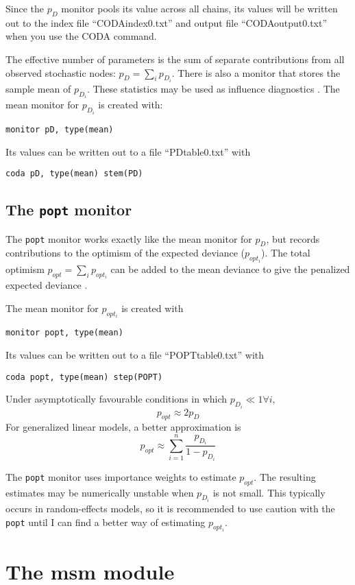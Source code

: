 \documentclass[11pt, a4paper, titlepage]{report}
\begin{document}
Since the $p_D$ monitor pools its value across all chains, its values
will be written out to the index file ``CODAindex0.txt'' and
output file ``CODAoutput0.txt'' when you use the CODA command.

The effective number of parameters is the sum of separate contributions
from all observed stochastic nodes: $p_D = \sum_i p_{D_i}$. There is
also a monitor that stores the sample mean of $p_{D_i}$. These statistics
may be used as influence diagnostics \cite{spiegelhalter:etal:2002}.
The mean monitor for $p_{D_i}$ is created with:
\begin{verbatim}
monitor pD, type(mean)
\end{verbatim}
Its values can be written out to a file ``PDtable0.txt'' with
\begin{verbatim}
coda pD, type(mean) stem(PD)
\end{verbatim}

\subsection{The \texttt{popt} monitor}

The \verb+popt+ monitor works exactly like the mean monitor for $p_D$,
but records contributions to the optimism of the expected deviance
($p_{opt_i}$). The total optimism $p_{opt} = \sum_i p_{opt_i}$  can be
added to the mean deviance to give the penalized expected deviance
\cite{plummer:2008}.

The mean monitor for $p_{opt_i}$ is created with
\begin{verbatim}
monitor popt, type(mean)
\end{verbatim}
Its values can be written out to a file ``POPTtable0.txt'' with
\begin{verbatim}
coda popt, type(mean) step(POPT)
\end{verbatim}
Under asymptotically favourable conditions in which $p_{D_i} \ll 1
\forall i$,
\[
p_{opt} \approx 2 p_D
\]
For generalized linear models, a better approximation is
\[
p_{opt} \approx \sum_{i=1}^n \frac {p_{D_i}}{1 - p_{D_i}}
\]

The \verb+popt+ monitor uses importance weights to estimate
$p_{opt}$. The resulting estimates may be numerically unstable when
$p_{D_i}$ is not small.  This typically occurs in random-effects
models, so it is recommended to use caution with the \verb+popt+
until I can find a better way of estimating $p_{opt_i}$.

\section{The msm module}
\end{document}
